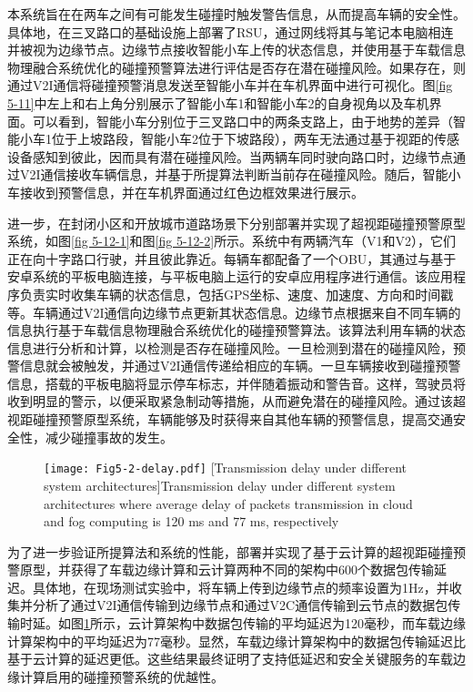 本系统旨在在两车之间有可能发生碰撞时触发警告信息，从而提高车辆的安全性。具体地，在三叉路口的基础设施上部署了RSU，通过网线将其与笔记本电脑相连并被视为边缘节点。边缘节点接收智能小车上传的状态信息，并使用基于车载信息物理融合系统优化的碰撞预警算法进行评估是否存在潜在碰撞风险。如果存在，则通过V2I通信将碰撞预警消息发送至智能小车并在车机界面中进行可视化。图\ref{fig 5-11}中左上和右上角分别展示了智能小车1和智能小车2的自身视角以及车机界面。可以看到，智能小车分别位于三叉路口中的两条支路上，由于地势的差异（智能小车1位于上坡路段，智能小车2位于下坡路段），两车无法通过基于视距的传感设备感知到彼此，因而具有潜在碰撞风险。当两辆车同时驶向路口时，边缘节点通过V2I通信接收车辆信息，并基于所提算法判断当前存在碰撞风险。随后，智能小车接收到预警信息，并在车机界面通过红色边框效果进行展示。

进一步，在封闭小区和开放城市道路场景下分别部署并实现了超视距碰撞预警原型系统，如图\ref{fig 5-12-1}和图\ref{fig 5-12-2}所示。系统中有两辆汽车（V1和V2），它们正在向十字路口行驶，并且彼此靠近。每辆车都配备了一个OBU，其通过与基于安卓系统的平板电脑连接，与平板电脑上运行的安卓应用程序进行通信。该应用程序负责实时收集车辆的状态信息，包括GPS坐标、速度、加速度、方向和时间戳等。车辆通过V2I通信向边缘节点更新其状态信息。边缘节点根据来自不同车辆的信息执行基于车载信息物理融合系统优化的碰撞预警算法。该算法利用车辆的状态信息进行分析和计算，以检测是否存在碰撞风险。一旦检测到潜在的碰撞风险，预警信息就会被触发，并通过V2I通信传递给相应的车辆。一旦车辆接收到碰撞预警信息，搭载的平板电脑将显示停车标志，并伴随着振动和警告音。这样，驾驶员将收到明显的警示，以便采取紧急制动等措施，从而避免潜在的碰撞风险。通过该超视距碰撞预警原型系统，车辆能够及时获得来自其他车辆的预警信息，提高交通安全性，减少碰撞事故的发生。

\begin{figure}[h]
\centering
  \texttt{[image: Fig5-2-delay.pdf]}
  [Transmission delay under different system architectures]{Transmission delay under different system architectures where average delay of packets transmission in cloud and fog computing is 120 ms and 77 ms, respectively}
  \label{fig 5-2}
\end{figure}

为了进一步验证所提算法和系统的性能，部署并实现了基于云计算的超视距碰撞预警原型，并获得了车载边缘计算和云计算两种不同的架构中600个数据包传输延迟。具体地，在现场测试实验中，将车辆上传到边缘节点的频率设置为1Hz，并收集并分析了通过V2I通信传输到边缘节点和通过V2C通信传输到云节点的数据包传输时延。如图\ref{fig 5-2}所示，云计算架构中数据包传输的平均延迟为120毫秒，而车载边缘计算架构中的平均延迟为77毫秒。显然，车载边缘计算架构中的数据包传输延迟比基于云计算的延迟更低。这些结果最终证明了支持低延迟和安全关键服务的车载边缘计算启用的碰撞预警系统的优越性。

